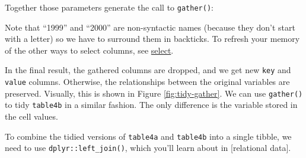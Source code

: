 \documentclass[]{book}
\newenvironment{Shaded}{\begin{snugshade}}{\end{snugshade}}
\newcommand{\KeywordTok}[1]{\textcolor[rgb]{0.13,0.29,0.53}{\textbf{#1}}}
\newcommand{\DataTypeTok}[1]{\textcolor[rgb]{0.13,0.29,0.53}{#1}}
\newcommand{\StringTok}[1]{\textcolor[rgb]{0.31,0.60,0.02}{#1}}
\newcommand{\CommentTok}[1]{\textcolor[rgb]{0.56,0.35,0.01}{\textit{#1}}}
\newcommand{\OperatorTok}[1]{\textcolor[rgb]{0.81,0.36,0.00}{\textbf{#1}}}
\newcommand{\NormalTok}[1]{#1}
\let\BeginKnitrBlock\begin \let\EndKnitrBlock\end
\begin{document}
Together those parameters generate the call to \texttt{gather()}:

\begin{Shaded}
\end{Shaded}

\BeginKnitrBlock{rmdimportant}
Note that ``1999'' and ``2000'' are non-syntactic names (because they
don't start with a letter) so we have to surround them in backticks. To
refresh your memory of the other ways to select columns, see
\protect\hyperlink{select}{select}.
\EndKnitrBlock{rmdimportant}

In the final result, the gathered columns are dropped, and we get new
\texttt{key} and \texttt{value} columns. Otherwise, the relationships
between the original variables are preserved. Visually, this is shown in
Figure \ref{fig:tidy-gather}. We can use \texttt{gather()} to tidy
\texttt{table4b} in a similar fashion. The only difference is the
variable stored in the cell values.

To combine the tidied versions of \texttt{table4a} and \texttt{table4b}
into a single tibble, we need to use \texttt{dplyr::left\_join()}, which
you'll learn about in {[}relational data{]}.
\end{document}
